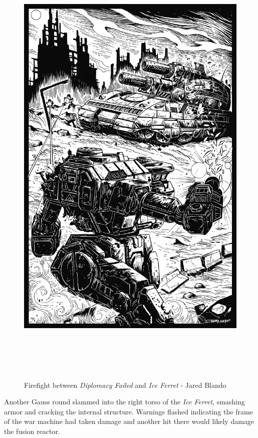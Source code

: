 \begin{figure}[!h]
  \centering
  \includegraphics[alt='Demolisher and Ice Ferret fighting', width=5.5in, height=8.5in]{img/Firefight.png}
  \caption*{Firefight between \emph{Diplomacy Failed} and \emph{Ice Ferret} - Jared Blando}
\end{figure}

\newpage


Another Gauss round slammed into the right torso of the \emph{Ice Ferret}, smashing armor and cracking the internal structure.
Warnings flashed indicating the frame of the war machine had taken damage and another hit there would likely damage the fusion reactor.

